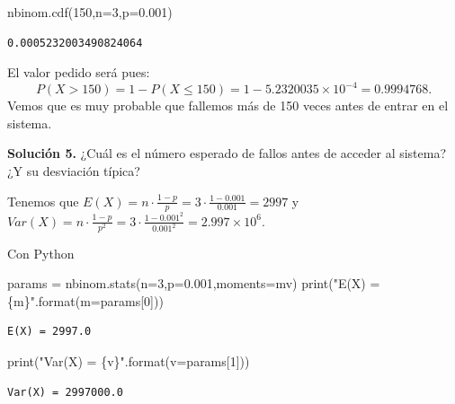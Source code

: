 \documentclass[
  letterpaper,
  DIV=11,
  numbers=noendperiod]{scrreprt}
\newenvironment{Shaded}{\begin{snugshade}}{\end{snugshade}}
\newcommand{\BuiltInTok}[1]{\textcolor[rgb]{0.00,0.23,0.31}{#1}}
\newcommand{\DecValTok}[1]{\textcolor[rgb]{0.68,0.00,0.00}{#1}}
\newcommand{\FloatTok}[1]{\textcolor[rgb]{0.68,0.00,0.00}{#1}}
\newcommand{\NormalTok}[1]{\textcolor[rgb]{0.00,0.23,0.31}{#1}}
\newcommand{\OperatorTok}[1]{\textcolor[rgb]{0.37,0.37,0.37}{#1}}
\newcommand{\SpecialCharTok}[1]{\textcolor[rgb]{0.37,0.37,0.37}{#1}}
\newcommand{\StringTok}[1]{\textcolor[rgb]{0.13,0.47,0.30}{#1}}
\begin{document}
\begin{Shaded}
\begin{Highlighting}[]
\NormalTok{nbinom.cdf(}\DecValTok{150}\NormalTok{,n}\OperatorTok{=}\DecValTok{3}\NormalTok{,p}\OperatorTok{=}\FloatTok{0.001}\NormalTok{)}
\end{Highlighting}
\end{Shaded}

\begin{verbatim}
0.0005232003490824064
\end{verbatim}

El valor pedido será pues: \[
P(X>150)=1-P(X\leq 150)=1-\ensuremath{5.2320035\times 10^{-4}}=0.9994768.
\] Vemos que es muy probable que fallemos más de 150 veces antes de
entrar en el sistema.

\textbf{Solución 5.} ¿Cuál es el número esperado de fallos antes de
acceder al sistema? ¿Y su desviación típica?

Tenemos que
\(E(X)=n\cdot \frac{1-p}{p}=3\cdot \frac{1- 0.001}{0.001}=2997\) y
\(Var(X)=n\cdot \frac{1-p}{p^2}=3\cdot \frac{1- 0.001^2}{0.001^2}=\ensuremath{2.997\times 10^{6}}.\)

Con Python

\begin{Shaded}
\begin{Highlighting}[]
\NormalTok{params }\OperatorTok{=}\NormalTok{ nbinom.stats(n}\OperatorTok{=}\DecValTok{3}\NormalTok{,p}\OperatorTok{=}\FloatTok{0.001}\NormalTok{,moments}\OperatorTok{=}\StringTok{\textquotesingle{}mv\textquotesingle{}}\NormalTok{)}
\BuiltInTok{print}\NormalTok{(}\StringTok{"E(X) = }\SpecialCharTok{\{m\}}\StringTok{"}\NormalTok{.}\BuiltInTok{format}\NormalTok{(m}\OperatorTok{=}\NormalTok{params[}\DecValTok{0}\NormalTok{]))}
\end{Highlighting}
\end{Shaded}

\begin{verbatim}
E(X) = 2997.0
\end{verbatim}

\begin{Shaded}
\begin{Highlighting}[]
\BuiltInTok{print}\NormalTok{(}\StringTok{"Var(X) = }\SpecialCharTok{\{v\}}\StringTok{"}\NormalTok{.}\BuiltInTok{format}\NormalTok{(v}\OperatorTok{=}\NormalTok{params[}\DecValTok{1}\NormalTok{]))}
\end{Highlighting}
\end{Shaded}

\begin{verbatim}
Var(X) = 2997000.0
\end{verbatim}
\end{document}
